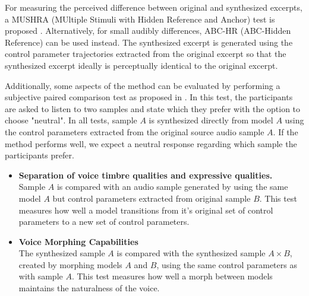 For measuring the perceived difference between original and synthesized excerpts, a MUSHRA (MUltiple Stimuli with Hidden Reference and Anchor) \cite{itu-r_recommendation_bs.1534_method_2003} test is proposed \cite{morise_cheaptrick_2015}\cite{morise_world:_2016}\cite{blaauw_neural_2017-1}. Alternatively, for small audibly differences, ABC-HR (ABC-Hidden Reference) \cite{itu-r_recommendation_bs.1534_method_2003} can be used instead. The synthesized excerpt is generated using the control parameter trajectories extracted from the original excerpt so that  the synthesized excerpt ideally is perceptually identical to the original excerpt. 

Additionally, some aspects of the method can be evaluated by performing a subjective paired comparison test as proposed in \cite{oord_wavenet:_2016}. In this test, the participants are asked to listen to two samples and state which they prefer with the option to choose "neutral". In all tests, sample $A$ is synthesized directly from model $A$ using the control parameters extracted from the original source audio sample $A$. If the method performs well, we expect a neutral response regarding which sample the participants prefer.

\begin{itemize}
    \item \textbf{Separation of voice timbre qualities and expressive qualities.}\\
    Sample $A$ is compared with an audio sample generated by using the same model $A$ but control parameters extracted from original sample $B$. This test measures how well a model transitions from it's original set of control parameters to a new set of control parameters.  
    \item \textbf{Voice Morphing Capabilities}\\
    The synthesized sample $A$ is compared with the synthesized sample $A \times B$, created by morphing models $A$ and $B$, using the same control parameters as with sample $A$. This test measures how well a morph between models maintains the naturalness of the voice.
\end{itemize}